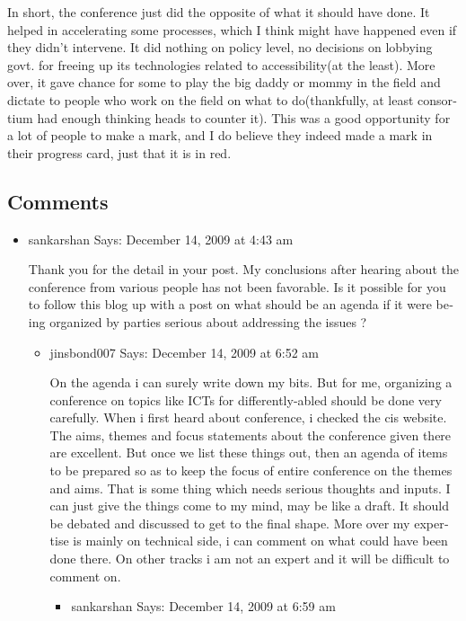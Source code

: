 \begin{english}
In short, the conference just did the opposite of what it should have done. It helped in accelerating some processes, which I think might have happened even if they didn’t intervene. It did nothing on policy level, no decisions on lobbying govt. for freeing up its technologies related to accessibility(at the least). More over, it gave chance for some to play the big daddy or mommy in the field and dictate to people who work on the field on what to do(thankfully, at least consortium had enough thinking heads to counter it). This was a good opportunity for a lot of people to make a mark, and I do believe they indeed made a mark in their progress card, just that it is in red.

\subsection*{Comments}
\begin{itemize}
\item sankarshan Says:
December 14, 2009 at 4:43 am

Thank you for the detail in your post. My conclusions after hearing about the conference from various people has not been favorable. Is it possible for you to follow this blog up with a post on what should be an agenda if it were being organized by parties serious about addressing the issues ?
    \begin{itemize}
    \item jinsbond007 Says:
    December 14, 2009 at 6:52 am

    On the agenda i can surely write down my bits. But for me, organizing a conference on topics like ICTs for differently-abled should be done very carefully. When i first heard about conference, i checked the cis website. The aims, themes and focus statements about the conference given there are excellent. But once we list these things out, then an agenda of items to be prepared so as to keep the focus of entire conference on the themes and aims. That is some thing which needs serious thoughts and inputs. I can just give the things come to my mind, may be like a draft. It should be debated and discussed to get to the final shape. More over my expertise is mainly on technical side, i can comment on what could have been done there. On other tracks i am not an expert and it will be difficult to comment on.
        \begin{itemize}
	\item sankarshan Says:
        December 14, 2009 at 6:59 am


\end{itemize}
\end{itemize}
\end{itemize}
\end{english}
